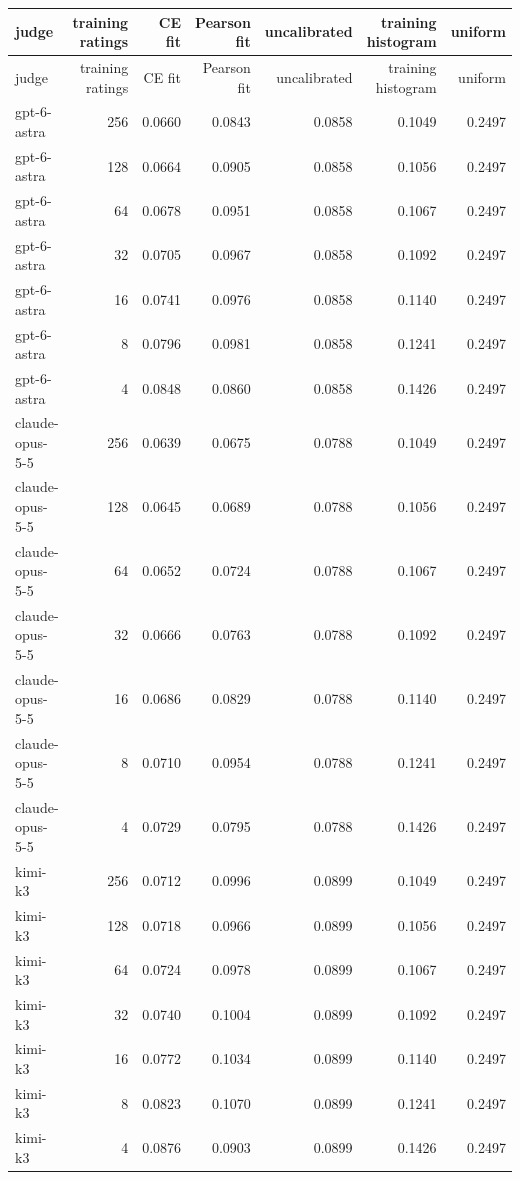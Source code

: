 \begin{longtable}{lrrrrrr}
\toprule
judge & training ratings & CE fit & Pearson fit & uncalibrated & training histogram & uniform \\
\midrule
\endfirsthead
\toprule
judge & training ratings & CE fit & Pearson fit & uncalibrated & training histogram & uniform \\
\midrule
\endhead
gpt-6-astra & 256 & 0.0660 & 0.0843 & 0.0858 & 0.1049 & 0.2497 \\
gpt-6-astra & 128 & 0.0664 & 0.0905 & 0.0858 & 0.1056 & 0.2497 \\
gpt-6-astra & 64 & 0.0678 & 0.0951 & 0.0858 & 0.1067 & 0.2497 \\
gpt-6-astra & 32 & 0.0705 & 0.0967 & 0.0858 & 0.1092 & 0.2497 \\
gpt-6-astra & 16 & 0.0741 & 0.0976 & 0.0858 & 0.1140 & 0.2497 \\
gpt-6-astra & 8 & 0.0796 & 0.0981 & 0.0858 & 0.1241 & 0.2497 \\
gpt-6-astra & 4 & 0.0848 & 0.0860 & 0.0858 & 0.1426 & 0.2497 \\
claude-opus-5-5 & 256 & 0.0639 & 0.0675 & 0.0788 & 0.1049 & 0.2497 \\
claude-opus-5-5 & 128 & 0.0645 & 0.0689 & 0.0788 & 0.1056 & 0.2497 \\
claude-opus-5-5 & 64 & 0.0652 & 0.0724 & 0.0788 & 0.1067 & 0.2497 \\
claude-opus-5-5 & 32 & 0.0666 & 0.0763 & 0.0788 & 0.1092 & 0.2497 \\
claude-opus-5-5 & 16 & 0.0686 & 0.0829 & 0.0788 & 0.1140 & 0.2497 \\
claude-opus-5-5 & 8 & 0.0710 & 0.0954 & 0.0788 & 0.1241 & 0.2497 \\
claude-opus-5-5 & 4 & 0.0729 & 0.0795 & 0.0788 & 0.1426 & 0.2497 \\
kimi-k3 & 256 & 0.0712 & 0.0996 & 0.0899 & 0.1049 & 0.2497 \\
kimi-k3 & 128 & 0.0718 & 0.0966 & 0.0899 & 0.1056 & 0.2497 \\
kimi-k3 & 64 & 0.0724 & 0.0978 & 0.0899 & 0.1067 & 0.2497 \\
kimi-k3 & 32 & 0.0740 & 0.1004 & 0.0899 & 0.1092 & 0.2497 \\
kimi-k3 & 16 & 0.0772 & 0.1034 & 0.0899 & 0.1140 & 0.2497 \\
kimi-k3 & 8 & 0.0823 & 0.1070 & 0.0899 & 0.1241 & 0.2497 \\
kimi-k3 & 4 & 0.0876 & 0.0903 & 0.0899 & 0.1426 & 0.2497 \\

\end{longtable}
